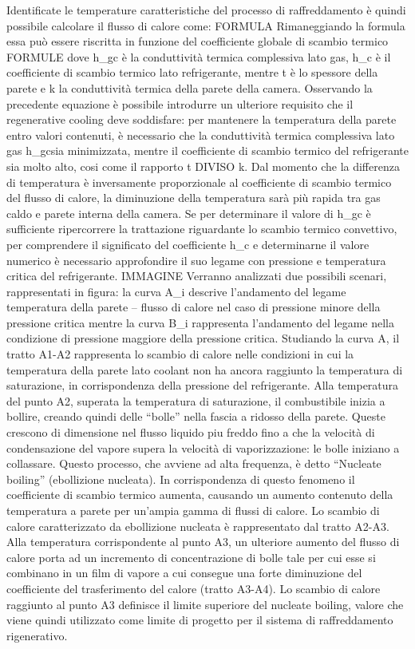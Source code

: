 Identificate le temperature caratteristiche del processo di raffreddamento è quindi possibile calcolare il flusso di calore come: FORMULA
Rimaneggiando la formula essa può essere riscritta in funzione del coefficiente globale di scambio termico FORMULE
dove h_{gc} è la conduttività termica complessiva lato gas, h_{c} è il coefficiente di scambio termico lato refrigerante, mentre t è lo spessore della parete e k la conduttività termica della parete della camera. Osservando la precedente equazione è possibile introdurre un ulteriore requisito che il regenerative cooling deve soddisfare: per mantenere la temperatura della parete entro valori contenuti, è necessario che la conduttività termica complessiva lato gas h_{gc}sia minimizzata, mentre il coefficiente di scambio termico del refrigerante sia molto alto, cosi come il rapporto t DIVISO k. Dal momento che la differenza di temperatura è inversamente proporzionale al coefficiente di scambio termico del flusso di calore, la diminuzione della temperatura sarà più rapida tra gas caldo e parete interna della camera.
Se per determinare il valore di h_{gc} è sufficiente ripercorrere la trattazione riguardante lo scambio termico convettivo, per comprendere il significato del coefficiente h_c e determinarne il valore numerico è necessario approfondire il suo legame con pressione e temperatura critica del refrigerante.
IMMAGINE Verranno analizzati due possibili scenari, rappresentati in figura: la curva A_i descrive l'andamento del legame temperatura della parete – flusso di calore nel caso di pressione minore della pressione critica mentre la curva B_i rappresenta l'andamento del legame nella condizione di pressione maggiore della pressione critica.
Studiando la curva A, il tratto A1-A2 rappresenta lo scambio di calore nelle condizioni in cui la temperatura della parete lato coolant non ha ancora raggiunto la temperatura di saturazione, in corrispondenza della pressione del refrigerante. Alla temperatura del punto A2, superata la temperatura di saturazione, il combustibile inizia a bollire, creando quindi delle “bolle” nella fascia a ridosso della parete. Queste crescono di dimensione nel flusso liquido piu freddo fino a che la velocità di condensazione del vapore supera la velocità di vaporizzazione: le bolle iniziano a collassare. Questo processo, che avviene ad alta frequenza, è detto “Nucleate boiling” (ebollizione nucleata). In corrispondenza di questo fenomeno il coefficiente di scambio termico aumenta, causando un aumento contenuto della temperatura a parete per un'ampia gamma di flussi di calore. Lo scambio di calore caratterizzato da ebollizione nucleata è rappresentato dal tratto A2-A3. Alla temperatura corrispondente al punto A3, un ulteriore aumento del flusso di calore porta ad un incremento di concentrazione di bolle tale per cui esse si combinano in un film di vapore a cui consegue una forte diminuzione del coefficiente del trasferimento del calore (tratto A3-A4). Lo scambio di calore raggiunto al punto A3 definisce il limite superiore del nucleate boiling, valore che viene quindi utilizzato come limite di progetto per il sistema di raffreddamento rigenerativo.
